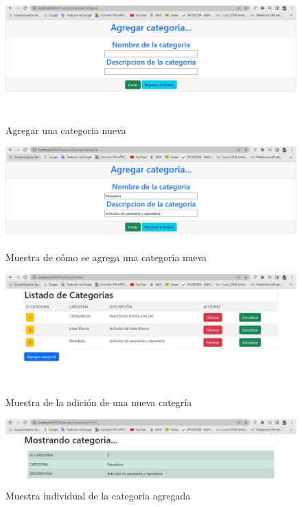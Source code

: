 \documentclass[10pt,a4paper]{article}
\begin{document}
\begin{figure}[H]
	\includegraphics[scale=.54]{Imagenes/crear.jpg}
	\centering \linebreak 
	\caption{Agregar una categoria nueva}
\end{figure} \hfill 

\begin{figure}[H]
	\includegraphics[scale=.54]{Imagenes/validacionAgregar.jpg}
	\centering \linebreak 
	\caption{Muestra de cómo se agrega una categoria nueva}
\end{figure} \hfill 

\begin{figure}[H]
	\includegraphics[scale=.54]{Imagenes/validacionAgregarMostrar.jpg}
	\centering \linebreak 
	\caption{Muestra de la adición de una nueva categría}
\end{figure} \hfill 

\begin{figure}[H]
	\includegraphics[scale=.54]{Imagenes/MostrarNuevo.jpg}
	\centering \linebreak 
	\caption{Muestra individual de la categoria agregada}
\end{figure} \hfill 
\end{document}
